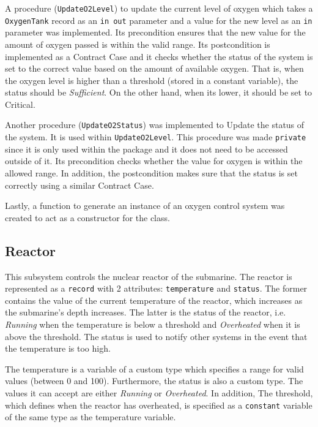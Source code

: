 \documentclass{llncs}
\begin{document}
A procedure (\texttt{UpdateO2Level}) to update the current level of oxygen which takes a \texttt{OxygenTank} record as an \texttt{in out} parameter and a value for the new level as an \texttt{in} parameter was implemented. Its precondition ensures that the new value for the amount of oxygen passed is within the valid range. Its postcondition is implemented as a Contract Case and it checks whether the status of the system is set to the correct value based on the amount of available oxygen. That is, when the oxygen level is higher than a threshold (stored in a constant variable), the status should be \textit{Sufficient}. On the other hand, when its lower, it should be set to Critical.

Another procedure (\texttt{UpdateO2Status}) was implemented to Update the status of the system. It is used within \texttt{UpdateO2Level}. This procedure was made \texttt{private} since it is only used within the package and it does not need to be accessed outside of it. Its precondition checks whether the value for oxygen is within the allowed range. In addition, the postcondition makes sure that the status is set correctly using a similar Contract Case.

Lastly, a function to generate an instance of an oxygen control system was created to act as a constructor for the class.

\subsection{Reactor}
This subsystem controls the nuclear reactor of the submarine. 
The reactor is represented as a \texttt{record} with 2 attributes: \texttt{temperature} and \texttt{status}. The former contains the value of the current temperature of the reactor, which increases as the submarine's depth increases. The latter is the status of the reactor, i.e. \textit{Running} when the temperature is below a threshold and \textit{Overheated} when it is above the threshold. The status is used to notify other systems in the event that the temperature is too high.

The temperature is a variable of a custom type which specifies a range for valid values (between 0 and 100). Furthermore, the status is also a custom type. The values it can accept are either \textit{Running} or \textit{Overheated}. In addition, The threshold, which defines when the reactor has overheated, is specified as a \texttt{constant} variable of the same type as the temperature variable.
\end{document}

